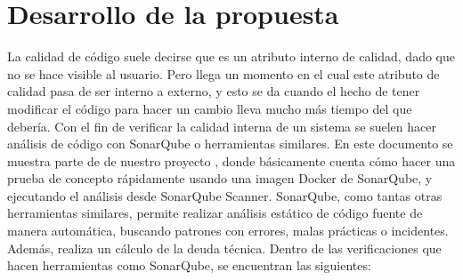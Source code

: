\documentclass[preprint,12pt]{elsarticle}
\begin{document}
\section{Desarrollo de la propuesta}
La calidad de código suele decirse que es un atributo interno de calidad, dado que no se hace visible al usuario. Pero llega un momento en el cual este atributo de calidad pasa de ser interno a externo, y esto se da cuando el hecho de tener modificar el código para hacer un cambio lleva mucho más tiempo del que debería. Con el fin de verificar la calidad interna de un sistema se suelen hacer análisis de código con SonarQube o herramientas similares. En este documento se muestra parte de de nuestro proyecto , donde básicamente cuenta cómo hacer una prueba de concepto rápidamente usando una imagen Docker de SonarQube, y ejecutando el análisis desde SonarQube Scanner.
SonarQube, como tantas otras herramientas similares, permite realizar análisis estático de código fuente de manera automática, buscando patrones con errores, malas prácticas o incidentes. Además, realiza un cálculo de la deuda técnica. Dentro de las verificaciones que hacen herramientas como SonarQube, se encuentran las siguientes:
\end{document}
